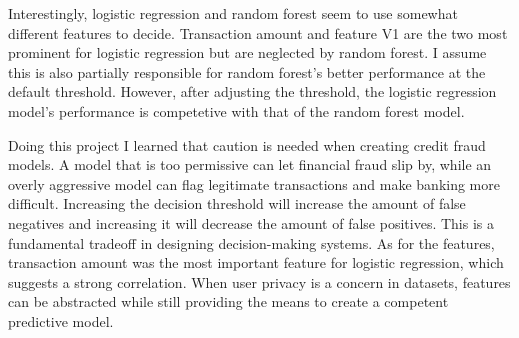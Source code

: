 \documentclass[12pt]{article}
\begin{document}
Interestingly, logistic regression and random forest seem to use somewhat different features to 
decide. Transaction amount and feature V1 are the two most prominent for logistic regression but
are neglected by random forest. I assume this is also partially responsible for random forest's
better performance at the default threshold. However, after adjusting the threshold, 
the logistic regression model's performance is competetive with that of the random forest model.

Doing this project I learned that caution is needed when creating credit fraud models. A model that
is too permissive can let financial fraud slip by, while an overly aggressive model can flag 
legitimate transactions and make banking more difficult. Increasing the decision threshold will
increase the amount of false negatives and increasing it will decrease the amount of false
positives. This is a fundamental tradeoff in designing decision-making systems. As for the features, transaction amount was the most important feature for logistic regression, which suggests a strong
correlation. When user privacy is a concern in datasets, features can be abstracted while still
providing the means to create a competent predictive model.
\end{document}
